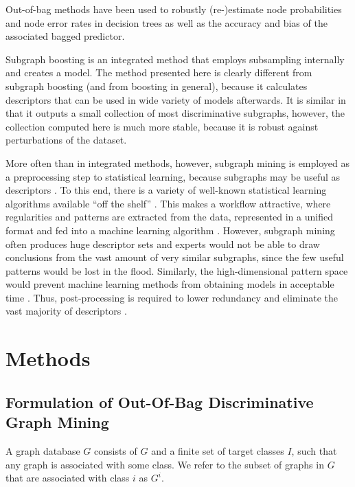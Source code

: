 \documentclass{article}
\begin{document}
Out-of-bag methods have been used to robustly (re-)estimate node probabilities
and node error rates in decision trees \cite{breiman96oob} as well as the
accuracy \cite{bylander02estimating, breiman96oob} and bias
\cite{bylander02estimating} of the associated bagged predictor.

Subgraph boosting \cite{saigo09gboost} is an integrated method that employs
subsampling internally and creates a model. The method presented here is
clearly different from subgraph boosting (and from boosting in general),
because it calculates descriptors that can be used in wide variety of models
afterwards. It is similar in that it outputs a small collection of most
discriminative subgraphs, however, the collection computed here is much more
stable, because it is robust against perturbations of the dataset.

More often than in integrated methods, however, subgraph mining is employed as
a preprocessing step to statistical learning, because subgraphs may be useful as
descriptors \cite{bringmann10lego,schietgat09mcsfeatures}. To this end, there
is a variety of well-known statistical learning algorithms available ``off the
shelf'' \cite{hall09weka,r08language}. This makes a workflow attractive, where
regularities and patterns are extracted from the data, represented in a unified
format and fed into a machine learning algorithm \cite{hkr03molfea}.  However,
subgraph mining often produces huge descriptor sets and experts would not be
able to draw conclusions from the vast amount of very similar subgraphs, since
the few useful patterns would be lost in the flood. Similarly, the
high-dimensional pattern space would prevent machine learning methods from
obtaining models in acceptable time \cite{Hasan_origami:mining}. Thus,
post-processing is required to lower redundancy and eliminate the vast majority
of descriptors \cite{schietgat09mcsfeatures, CMNK01Frequent, Jun04Spin}. 



\section{Methods}
\subsection{Formulation of Out-Of-Bag Discriminative Graph Mining}

A graph database $G$ consists of $G$ and a finite set of target classes $I$,
such that any graph is associated with some class. We refer to the subset of
graphs in $G$ that are associated with class $i$ as $G^i$.
\end{document}
